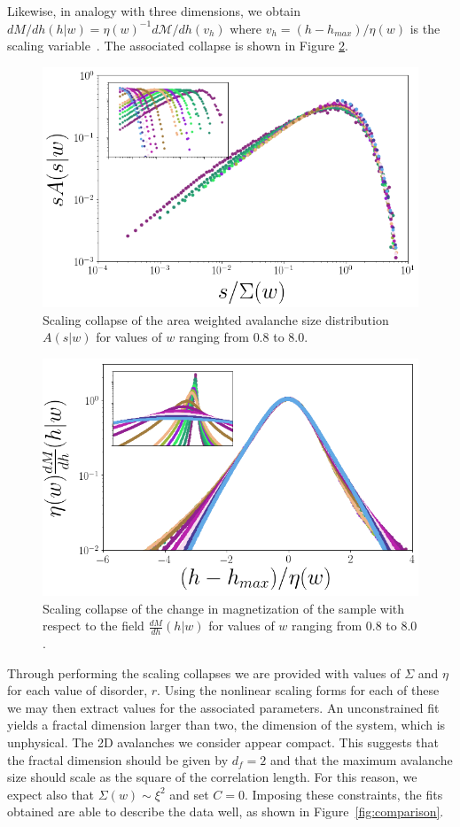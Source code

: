 \documentclass[reprint,amsmath,amssymb,aps,floatfix]{revtex4-1}
\begin{document}
%
Likewise, in analogy with three dimensions, we obtain $dM/dh(h|w)=\eta(w)^{-1} d\mathcal{M}/dh(v_h)$ where $v_h=(h-h_{max})/\eta(w)$ is the scaling variable~\cite[Section~\ref{supp-app:magscale}]{RFIM2Dsupp}. The associated collapse is shown in Figure \ref{fig:dMdh_collapse}.
%
\begin{figure}
	\includegraphics[scale=0.3]{A_collapse_inset.png}
  	\caption{Scaling collapse of the area weighted avalanche size distribution $A(s|w)$ for values of $w$ ranging from $0.8$ to $8.0$.}
  	\label{fig:As_collapse}
\end{figure}
%
\begin{figure}
	\includegraphics[scale=0.3]{dMdh_collapse_inset.png}
  	\caption{ Scaling collapse of the change in magnetization of the sample with respect to the field $\frac{dM}{dh}(h|w)$ for values of $w$ ranging from $0.8$ to $8.0$. }
  	\label{fig:dMdh_collapse}
\end{figure}
%
Through performing the scaling collapses we are provided with values of $\Sigma$ and $\eta$ for each value of disorder, $r$.  Using the nonlinear scaling forms for each of these we may then extract values for the associated parameters. An unconstrained fit yields a fractal dimension larger than two, the dimension of the system, which is unphysical. The 2D avalanches we consider appear compact. This suggests that the fractal dimension should be given by $d_f=2$ and that the maximum avalanche size should scale as the square of the correlation length. For this reason, we expect also that $\Sigma(w)\sim\xi^2$ and set $C=0$. Imposing these constraints, the fits obtained are able to describe the data well, as shown in Figure~\ref{fig:comparison}.\par
\end{document}
